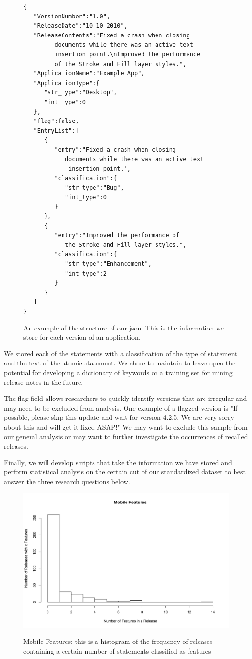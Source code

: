 \documentclass{acm_proc_article-sp}
\begin{document}
\begin{figure}
\begin{verbatim}
{  
   "VersionNumber":"1.0",
   "ReleaseDate":"10-10-2010",
   "ReleaseContents":"Fixed a crash when closing
   		 documents while there was an active text 
   		 insertion point.\nImproved the performance 
   		 of the Stroke and Fill layer styles.",
   "ApplicationName":"Example App",
   "ApplicationType":{  
      "str_type":"Desktop",
      "int_type":0
   },
   "flag":false,
   "EntryList":[  
      {  
         "entry":"Fixed a crash when closing 
         	documents while there was an active text
         	 insertion point.",
         "classification":{  
            "str_type":"Bug",
            "int_type":0
         }
      },
      {  
         "entry":"Improved the performance of 
         	the Stroke and Fill layer styles.",
         "classification":{  
            "str_type":"Enhancement",
            "int_type":2
         }
      }
   ]
}
\end{verbatim}
\caption{An example of the structure of our json. This is the information we store for each version of an application.}
\label{fig:jsonEx}
\end{figure}

We stored each of the statements with a classification of the type of statement and the text of the atomic statement.
We chose to maintain  to leave open the potential for developing a dictionary of keywords or a training set for mining release notes in the future.

The flag field allows researchers to quickly identify versions that are irregular and may need to be excluded from analysis.
One example of a flagged version is "If possible, please skip this update and wait for version 4.2.5. We are very sorry about this and will get it fixed ASAP!"
We may want to exclude this sample from our general analysis or may want to further investigate the occurrences of recalled releases.

Finally, we will develop scripts that take the information we have stored and perform statistical analysis on the certain cut of our standardized dataset to best answer the three research questions below.

\begin{figure}

\begin{center}
\includegraphics[width=.5\textwidth]{mobileFeaturesHist.pdf}
\label{fig:mobHist}
\caption{Mobile Features: this is a histogram of the frequency of releases containing a certain number of statements classified as features}
\end{center}
\end{figure}
\end{document}

